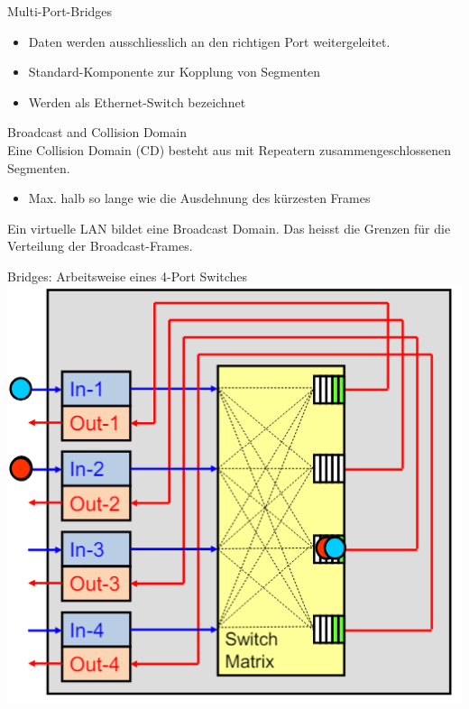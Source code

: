 \begin{definition}{Multi-Port-Bridges}
    \begin{itemize}
        \item Daten werden ausschliesslich an den richtigen Port weitergeleitet.
        \item Standard-Komponente zur Kopplung von Segmenten
        \item Werden als Ethernet-Switch bezeichnet
    \end{itemize}
\end{definition}

\begin{concept}{Broadcast and Collision Domain}\\
    Eine Collision Domain (CD) besteht aus mit Repeatern zusammengeschlossenen Segmenten.
    \begin{itemize}
        \item Max. halb so lange wie die Ausdehnung des kürzesten Frames
    \end{itemize}
    Ein virtuelle LAN bildet eine Broadcast Domain. Das heisst die Grenzen für die Verteilung der
    Broadcast-Frames. 
\end{concept}

\begin{definition}{Bridges: Arbeitsweise eines 4-Port Switches}\\
        \includegraphics[width=0.5\linewidth]{images/bridges_4portswitch.png}
\end{definition}

